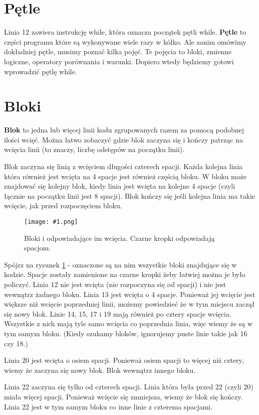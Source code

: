 \documentclass{book}
\newcommand{\img}[3]{
\begin{figure}
\centerline{
	\texttt{[image: \#1.png]}
}
\caption{#2}
\label{#1}
\end{figure}
}
\begin{document}
\section{Pętle}

Linia 12 zawiera instrukcję while, która oznacza początek pętli while. {\bf Pętle} to części programu które są wykonywane wiele razy w kółko. Ale zanim omówimy dokładniej pętle, musimy poznać kilka pojęć. Te pojęcia to bloki, zmienne logiczne, operatory porównania i warunki. Dopiero wtedy będziemy gotowi wprowadzić pętlę while.

\section{Bloki}

{\bf Blok} to jedna lub więcej linii kodu zgrupowanych razem za pomocą podobnej ilości wcięć. Można łatwo zobaczyć gdzie blok zaczyna się i kończy patrząc na wcięcia linii (to znaczy, liczbę odstępów na początku linii).

Blok zaczyna się linią z wcięciem długości czterech spacji. Każda kolejna linia która również jest wcięta na 4 spacje jest również częścią bloku. W bloku może znajdować się kolejny blok, kiedy linia jest wcięta na kolejne 4 spacje (czyli łącznie na początku linii jest 8 spacji). Blok kończy się jeśli kolejna linia ma takie wcięcie, jak przed rozpoczęciem bloku.

\img{guess-blocks}{Bloki i odpowiadające im wcięcia. Czarne kropki odpowiadają spacjom.}{7cm}

Spójrz na rysunek \ref{guess-blocks} - oznaczone są na nim wszystkie bloki znajdujące się w kodzie. Spacje zostały zamienione na czarne kropki żeby łatwiej można je było policzyć. Linia 12 nie jest wcięta (nie rozpoczyna się od spacji) i nie jest wewnątrz żadnego bloku. Linia 13 jest wcięta o 4 spacje. Ponieważ jej wcięcie jest większe niż wcięcie poprzedniej linii, możemy powiedzieć że w tym miejscu zaczął się nowy blok. Linie 14, 15, 17 i 19 mają również po cztery spacje wcięcia. Wszystkie z nich mają tyle samo wcięcia co poprzednia linia, więc wiemy że są w tym samym bloku. (Kiedy szukamy bloków, ignorujemy puste linie takie jak 16 czy 18.)

Linia 20 jest wcięta o osiem spacji. Ponieważ osiem spacji to więcej niż cztery, wiemy że zaczyna się nowy blok. Blok wewnątrz innego bloku.

Linia 22 zaczyna się tylko od czterech spacji. Linia która była przed 22 (czyli 20) miała więcej spacji. Ponieważ wcięcie się zmniejsza, wiemy że blok się kończy. Linia 22 jest w tym samym bloku co inne linie z czterema spacjami.
\end{document}
